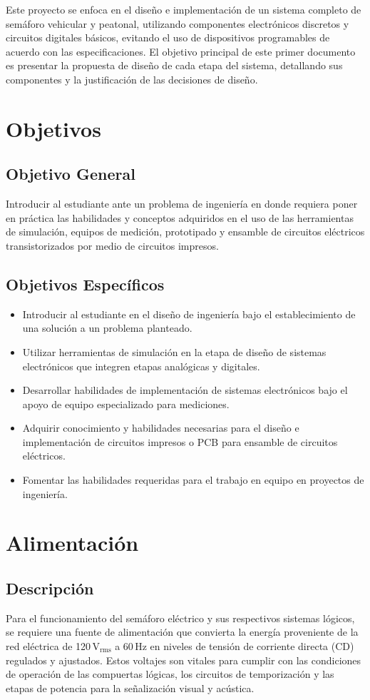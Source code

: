 \documentclass[12pt, journal, onecolumn]{IEEEtran}
\begin{document}
	Este proyecto se enfoca en el diseño e implementación de un sistema completo de semáforo vehicular y peatonal, utilizando componentes electrónicos discretos y circuitos digitales básicos, evitando el uso de dispositivos programables de acuerdo con las especificaciones. El objetivo principal de este primer documento es presentar la propuesta de diseño de cada etapa del sistema, detallando sus componentes y la justificación de las decisiones de diseño.
	
	\section{Objetivos}
	\subsection{Objetivo General}
	Introducir al estudiante ante un problema de ingeniería en donde requiera poner en práctica las habilidades y conceptos adquiridos en el uso de las herramientas de simulación, equipos de medición, prototipado y ensamble de circuitos eléctricos transistorizados por medio de circuitos impresos.
	
	\subsection{Objetivos Específicos}
	\begin{itemize}
		\item Introducir al estudiante en el diseño de ingeniería bajo el establecimiento de una solución a un problema planteado.
		\item Utilizar herramientas de simulación en la etapa de diseño de sistemas electrónicos que integren etapas analógicas y digitales.
		\item Desarrollar habilidades de implementación de sistemas electrónicos bajo el apoyo de equipo especializado para mediciones.
		\item Adquirir conocimiento y habilidades necesarias para el diseño e implementación de circuitos impresos o PCB para ensamble de circuitos eléctricos.
		\item Fomentar las habilidades requeridas para el trabajo en equipo en proyectos de ingeniería.
	\end{itemize}
	
	\section{\textbf{Alimentación}}
	\subsection{Descripción}
	Para el funcionamiento del semáforo eléctrico y sus respectivos sistemas lógicos, se requiere una fuente de alimentación que convierta la energía proveniente de la red eléctrica de 120\,$\text{V}_{\text{rms}}$ a 60\,Hz en niveles de tensión de corriente directa (CD) regulados y ajustados. Estos voltajes son vitales para cumplir con las condiciones de operación de las compuertas lógicas, los circuitos de temporización y las etapas de potencia para la señalización visual y acústica.\\
	
\end{document}
